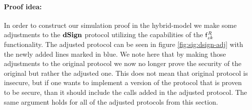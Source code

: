 \paragraph{Proof idea:} In order to construct our simulation proof in the hybrid-model we make some adjustments to the $\mathbf{dSign}$ protocol utilizing the capabilities of the $\mathsf{f}^{\mathit{R}}_{zk}$ functionality.
The adjusted protocol can be seen in figure \cref{fig:sig:dsign-adj} with the newly added lines marked in blue.
We note here that by making those adjustments to the original protocol we now no longer prove the security of the original but rather the adjusted one.
This does not mean that original protocol is insecure, but if one wants to implement a version of the protocol that is proven to be secure, than it should include the calls added in the adjusted protocol.
The same argument holds for all of the adjusted protocols from this section.
